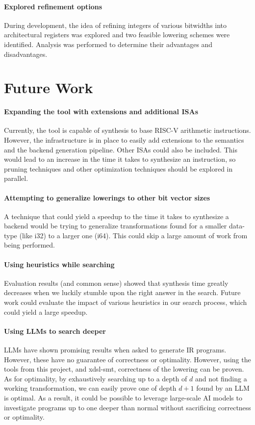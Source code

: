 \paragraph{Explored refinement options}
During development, the idea of refining integers of various bitwidths into architectural
registers was explored and two feasible lowering schemes were identified. Analysis was
performed to determine their advantages and disadvantages.


\section{Future Work}

\paragraph{Expanding the tool with extensions and additional ISAs} 
Currently, the tool is capable of synthesis to base RISC-V arithmetic instructions. However,
the infrastructure is in place to easily add extensions to the semantics and the backend 
generation pipeline. Other ISAs could also be included.
This would lead to an increase in the time it takes to synthesize an instruction, so pruning
techniques and other optimization techniques should be explored in parallel.

\paragraph{Attempting to generalize lowerings to other bit vector sizes}
A technique that could yield a speedup to the time it takes to synthesize a backend would
be trying to generalize transformations found for a smaller data-type (like i32) to a larger
one (i64). This could skip a large amount of work from being performed.

\paragraph{Using heuristics while searching}
Evaluation results (and common sense) showed that synthesis time greatly decreases when we
luckily stumble upon the right answer in the search. Future work could evaluate the impact
of various heuristics in our search process, which could yield a large speedup.

\paragraph{Using LLMs to search deeper}
LLMs have shown promising results when asked to generate IR programs. However, these have
no guarantee of correctness or optimality. However, using the tools from this project, and
xdsl-smt, correctness of the lowering can be proven. As for optimality, by exhaustively 
searching up to a depth of $d$ and not finding a working transformation, we can easily 
prove one of depth $d+1$ found by an LLM is optimal. As a result, it could be possible 
to leverage large-scale AI models to investigate programs up to one deeper than normal
without sacrificing correctness or optimality.


